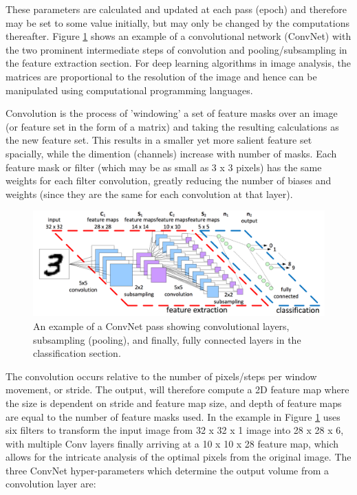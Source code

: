 \documentclass[fleqn,twoside,12pt]{report}
\begin{document}
These parameters are calculated and updated at each pass (epoch) and therefore may be set to some value initially, but may only be changed by the computations thereafter. Figure \ref{fig:conv3} shows an example of a convolutional network (ConvNet) with the two prominent intermediate steps of convolution and pooling/subsampling in the feature extraction section. For deep learning algorithms in image analysis, the matrices are proportional to the resolution of the image and hence can be manipulated using computational programming languages. 

Convolution is the process of 'windowing' a set of feature masks over an image (or feature set in the form of a matrix) and taking the resulting calculations as the new feature set. This results in a smaller yet more salient feature set spacially, while the dimention (channels) increase with number of masks. Each feature mask or filter (which may be as small as 3 x 3 pixels) has the same weights for each filter convolution, greatly reducing the number of biases and weights (since they are the same for each convolution at that layer). 

\begin{figure}[h]
	\centering
	\includegraphics[width=\textwidth]{conv3.png}
	\caption{An example of a ConvNet pass showing convolutional layers, subsampling (pooling), and finally, fully connected layers in the classification section.}
	\label{fig:conv3}
\end{figure}

The convolution occurs relative to the number of pixels/steps per window movement, or stride. The output, will therefore compute a 2D feature map where the size is dependent on stride and feature map size, and depth of feature maps are equal to the number of feature masks used. In the example in Figure \ref{fig:conv3} uses six filters to transform the input image from 32 x 32 x 1 image into 28 x 28 x 6, with multiple Conv layers finally arriving at a 10 x 10 x 28 feature map, which allows for the intricate analysis of the optimal pixels from the original image. The three ConvNet hyper-parameters which determine the output volume from a convolution layer are:
\end{document}
